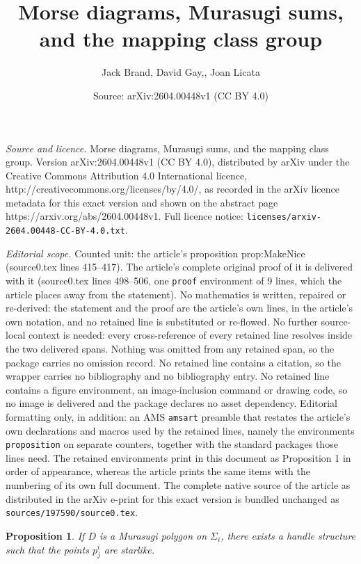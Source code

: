 \documentclass[10pt,a4paper]{amsart}
\title{Morse diagrams, Murasugi sums, and the mapping class group}
\author{Jack Brand, David Gay,, Joan Licata}
\date{Source: arXiv:2604.00448v1 (CC BY 4.0)}
\newtheorem{proposition}{Proposition}
\begin{document}
\maketitle

\noindent\emph{Source and licence.} Morse diagrams, Murasugi sums, and the mapping class group. Version arXiv:2604.00448v1 (CC BY 4.0), distributed by arXiv under the Creative Commons Attribution 4.0 International licence, http://creativecommons.org/licenses/by/4.0/, as recorded in the arXiv licence metadata for this exact version and shown on the abstract page https://arxiv.org/abs/2604.00448v1. Full licence notice: \texttt{licenses/arxiv-2604.00448-CC-BY-4.0.txt}.\par\smallskip

\noindent\textit{Editorial scope.} Counted unit: the article's proposition prop:MakeNice (source0.tex lines 415--417). The article's complete original proof of it is delivered with it (source0.tex lines 498--506, one \texttt{proof} environment of 9 lines, which the article places away from the statement). No mathematics is written, repaired or re-derived: the statement and the proof are the article's own lines, in the article's own notation, and no retained line is substituted or re-flowed.  No further source-local context is needed: every cross-reference of every retained line resolves inside the two delivered spans.  Nothing was omitted from any retained span, so the package carries no omission record.  No retained line contains a citation, so the wrapper carries no bibliography and no bibliography entry.  No retained line contains a figure environment, an image-inclusion command or drawing code, so no image is delivered and the package declares no asset dependency.  Editorial formatting only, in addition: an AMS \texttt{amsart} preamble that restates the article's own declarations and macros used by the retained lines, namely the environments \texttt{proposition} on separate counters, together with the standard packages those lines need.  The retained environments print in this document as Proposition 1 in order of appearance, whereas the article prints the same items with the numbering of its own full document.  The complete native source of the article as distributed in the arXiv e-print for this exact version is bundled unchanged as \texttt{sources/197590/source0.tex}.
\begin{proposition}\label{prop:MakeNice} 
If $D$ is a Murasugi polygon on $\Sigma_i$, there exists a handle structure such that the points $p_j^i$ are starlike.   
\end{proposition}
\end{document}
